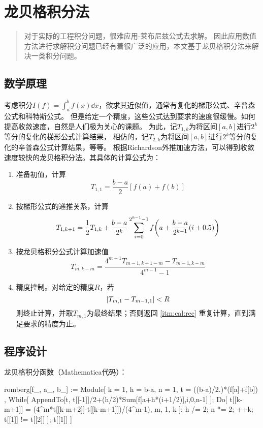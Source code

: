 \documentclass{hitgsrep}
\begin{document}
\maketitle

\section{龙贝格积分法}

\begin{abstract}
    对于实际的工程积分问题，很难应用-莱布尼兹公式去求解。
    因此应用数值方法进行求解积分问题已经有着很广泛的应用，本文基于龙贝格积分法来解决一类积分问题。
\end{abstract}

\subsection{数学原理}

考虑积分$I(f)=\int_a^b f(x)\dd{x}$，欲求其近似值，通常有复化的梯形公式、辛普森公式和科特斯公式。
但是给定一个精度，这些公式达到要求的速度很缓慢。如何提高收敛速度，自然是人们极为关心的课题。
为此，记$T_{1,k}$为将区间$[a,b]$进行$2^k$等分的复化的梯形公式计算结果，
相仿的，记$T_{2,k}$为将区间$[a,b]$进行$2^k$等分的复化的辛普森公式计算结果，等等。
根据Richardson外推加速方法，可以得到收敛速度较快的龙贝格积分法。其具体的计算公式为：
\begin{enumerate}
    \item 准备初值，计算
    $$
        T_{1,1}=\frac{b-a}{2}[f(a)+f(b)]
    $$
    \item\label{itm:cal:rec} 按梯形公式的递推关系，计算
    $$
        T_{1,k+1}=\frac{1}{2}T_{1,k}+\frac{b-a}{2^k}\sum_{i=0}^{2^{k-1}-1}f\qty(a+\frac{b-a}{2^{k-1}}(i+0.5))
    $$
    \item 按龙贝格积分公式计算加速值
    $$
        T_{m,k-m}=\frac{4^{m-1}T_{m-1,k+1-m}-T_{m-1,k-m}}{4^{m-1}-1}
    $$
    \item 精度控制。对给定的精度$R$，若
    $$
        \abs{T_{m,1}-T_{m-1,1}}<R
    $$
    则终止计算，并取$T_{m,1}$为最终结果；否则返回 \ref{itm:cal:rec} 重复计算，直到满足要求的精度为止。
\end{enumerate}

\subsection{程序设计}

龙贝格积分函数（Mathematica代码）：
\begin{wlcode}
romberg[f_, {a_, b_}] := Module[{
  k = 1,
  h = b-a,
  n = 1,
  t = {((b-a)/2.)*(f[a]+f[b])}
  },
  While[
    AppendTo[t,
      t[[-1]]/2+(h/2)*Sum[f[a+h*(i+1/2)],{i,0,n-1}]
    ];
    Do[
      t[[k-m+1]] = (4^m*t[[k-m+2]]-t[[k-m+1]])/(4^m-1),
      {m, 1, k}
    ];
    h /= 2;
    n *= 2;
    ++k;
    t[[1]] != t[[2]]
  ];
  t[[1]]
]
\end{wlcode}
\end{document}
